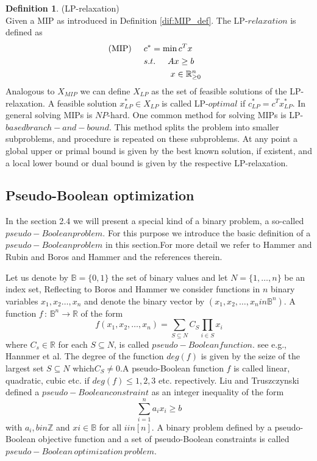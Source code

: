 \documentclass[11pt]{article}
\theoremstyle{definition}
\newtheorem{definition}{Definition}[section] %
\begin{document}
\begin{definition}
(LP-relaxation)\\
Given a MIP as introduced in Definition \ref{dif:MIP_def}. The LP-$relaxation$ is defined as
	\begin{align*}
	\text{(MIP)} \hspace{5mm} &c^* = \text{min}\,c^Tx& \\
	&s.t.\hspace{5mm} Ax \geq b  \\
	&\hspace{11mm} x \in \mathbb{R}_{\geq0}^n 
	\label{dif:LP-relax}
	\end{align*}
Analogous to $X_{MIP}$ we can define $X_{LP}$ as the set of feasible solutions of the LP-relaxation. A feasible solution $x_{LP}^* \in X_{LP}$ is called LP-$optimal$ if $c_{LP}^* = c^Tx_{LP}^*$. In general solving MIPs is $NP$-hard. One common method for solving MIPs is LP-$based branch-and-bound$. This method splits the problem into smaller subproblems, and procedure is repeated on these subproblems. At any point a global upper or primal bound is given by the best known solution, if existent, and a local lower bound or dual bound is given by the respective LP-relaxation.\par

\subsection{Pseudo-Boolean optimization}
 In the section 2.4 we will present a special kind of a binary problem, a so-called $pseudo-Boolean problem$. For this purpose we introduce the basic definition of a $pseudo-Boolean problem$ in this section.For more detail we refer to Hammer and Rubin and Boros and Hammer and the references therein.\par
 Let us denote by $\mathbb{B} = \{0,1 \}$ the set of binary values and let $N = \{ 1, \dots ,n  \}$ be an index set, Reflecting to Boros and Hammer we consider functions in $n$ binary variables $x_1, x_2\dots ,x_n$ and denote the binary vector by $(x_1, x_2, \dots,x_n in \mathbb{B}^n)$. A function $f\,:\, \mathbb{B}^n \rightarrow\mathbb{R}$ of the form 
 $$\displaystyle{f(x_1,x_2,\dots,x_n) = \sum \limits_{S \subseteq N} C_S  \prod \limits_{i \in S}x_i}$$
 where $C_s \in \mathbb{R}$ for each $ S \subseteq N$, is called $pseudo-Boolean function$. see e.g., Hannmer et al. The degree of the function $deg(f)$ is given by the seize of the largest set $S \subseteq	N$ which$C_S \neq 0$.A pseudo-Boolean function $f$ is called linear, quadratic, cubic etc. if $deg(f) \leq 1,2,3 $ etc. repectively. Liu and Truszczynski defined a $pseudo-Boolean constraint $ as an integer inequality of the form 
 $$\sum \limits_{i=1}^{n} a_ix_i \geq b$$
 with $a_i,b in \mathbb{Z}$ and $xi\in \mathbb{B}$ for all $i in [n]$. A binary problem defined by a pseudo-Boolean objective function and a set of pseudo-Boolean constraints is called $pseudo-Boolean\, optimization\, problem$. \par


	
	 
 
\end{definition}
\end{document}
